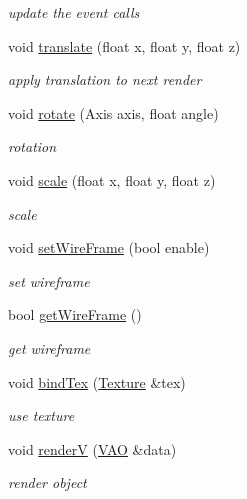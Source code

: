 \begin{DoxyCompactItemize}
\begin{DoxyCompactList}\small\item\em update the event calls \end{DoxyCompactList}\item 
void \hyperlink{class_render_engine_aa204613d418099a75efb240fb50025b5}{translate} (float x, float y, float z)
\begin{DoxyCompactList}\small\item\em apply translation to next render \end{DoxyCompactList}\item 
void \hyperlink{class_render_engine_ae848f09c3401e2320d037cf8f1aa41c6}{rotate} (Axis axis, float angle)
\begin{DoxyCompactList}\small\item\em rotation \end{DoxyCompactList}\item 
void \hyperlink{class_render_engine_a4590f334e5284f3f722793028df97926}{scale} (float x, float y, float z)
\begin{DoxyCompactList}\small\item\em scale \end{DoxyCompactList}\item 
void \hyperlink{class_render_engine_aef04b2b6db3a023dcf9e92a55098d1ed}{set\-Wire\-Frame} (bool enable)
\begin{DoxyCompactList}\small\item\em set wireframe \end{DoxyCompactList}\item 
bool \hyperlink{class_render_engine_a99e16cbcc316fcbcc10df80db224bc2e}{get\-Wire\-Frame} ()
\begin{DoxyCompactList}\small\item\em get wireframe \end{DoxyCompactList}\item 
void \hyperlink{class_render_engine_afa295b21d41e28792bd175bc4792859a}{bind\-Tex} (\hyperlink{class_texture}{Texture} \&tex)
\begin{DoxyCompactList}\small\item\em use texture \end{DoxyCompactList}\item 
void \hyperlink{class_render_engine_a215dfb9663adfe099943c67f70504aaf}{render\-V} (\hyperlink{class_v_a_o}{V\-A\-O} \&data)
\begin{DoxyCompactList}\small\item\em render object \end{DoxyCompactList}\item 

\end{DoxyCompactItemize}
